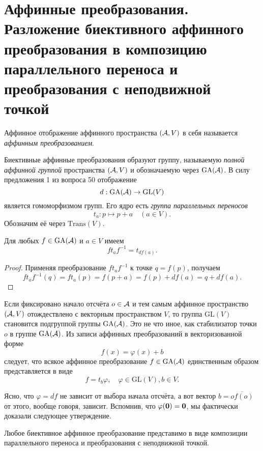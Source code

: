 \section{Аффинные преобразования. Разложение биективного аффинного преобразования в
композицию параллельного переноса и преобразования с неподвижной точкой}

\begin{definition}
    Аффинное отображение аффинного пространства $(\mathcal{A}, V)$ в себя называется \textit{аффинным преобразованием}.
\end{definition}

Биективные аффинные преобразования образуют группу, называемую \textit{полной аффинной группой} пространства $(\mathcal{A}, V)$ и обозначаемую через $\mathrm{GA}(\mathcal{A})$. В силу предложения 1 из вопроса 50 отображение
\[
    d: \mathrm{GA}(\mathcal{A}) \to \mathrm{GL}(V)
\]
является гомоморфизмом групп. Его ядро есть \textit{группа параллельных переносов}
\[
    t_a: p \mapsto p + a\quad(a \in V).
\]
Обозначим её через $\mathrm{Trans}(V)$.

\begin{proposal}
    Для любых $f \in \mathrm{GA}(\mathcal{A})$ и $a \in V$ имеем
    \[
        ft_af^{-1} = t_{df(a)}.
    \]
\end{proposal}

\begin{proof}
    Применяя преобразование $ft_af^{-1}$ к точке $q = f(p)$, получаем
    \[
        ft_af^{-1}(q) = ft_a(p) = f(p + a) = f(p) + df(a) = q + df(a).
    \]
\end{proof}

Если фиксировано начало отсчёта $o \in \mathcal{A}$ и тем самым аффинное пространство $(\mathcal{A}, V)$ отождествлено с векторным пространством $V$, то группа $\mathrm{GL}(V)$ становится подгруппой группы $\mathrm{GA}(\mathcal{A})$. Это не что иное, как стабилизатор точки $o$ в группе $\mathrm{GA}(\mathcal{A})$. Из записи аффинных преобразований в векторизованной форме
\[
    f(x) = \varphi(x) + b
\]
следует, что всякое аффинное преобразование $f \in \mathrm{GA}(\mathcal{A})$ единственным образом представляется в виде
\[
    f = t_b\varphi,\quad \varphi \in \mathrm{GL}(V), b \in V.
\]

Ясно, что $\varphi = df$ не зависит от выбора начала отсчёта, а вот вектор $b = \overline{of(o)}$ от этого, вообще говоря, зависит. Вспомнив, что $\varphi(\boldsymbol{0}) = \boldsymbol{0}$, мы фактически доказали следующее утверждение.

\begin{theorem}
    Любое биективное аффинное преобразование представимо в виде композиции параллельного переноса и преобразования с неподвижной точкой.
\end{theorem}

